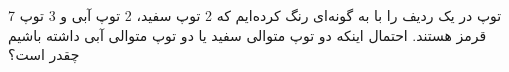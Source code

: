 7 توپ در یک ردیف را با به گونه‌ای رنگ کرده‌ایم که 2 توپ سفید، 2 توپ آبی و 3 توپ قرمز هستند.
احتمال اینکه دو توپ متوالی سفید یا دو توپ متوالی آبی داشته باشیم چقدر است؟